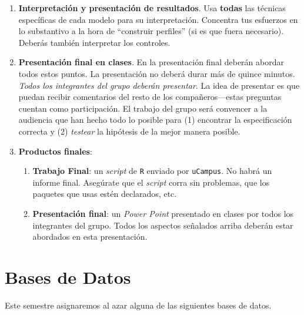 \documentclass[10pt]{article}
\begin{document}
\begin{enumerate}
  \item {\bf Interpretaci\'on y presentaci\'on de resultados}. Usa {\bf todas} las t\'ecnicas espec\'ificas de cada modelo para su interpretaci\'on. Concentra tus esfuerzos en lo substantivo a la hora de ``construir perfiles'' (si es que fuera necesario). Deber\'as tambi\'en interpretar los controles.

  \item {\bf Presentaci\'on final en clases}. En la presentaci\'on final deber\'an abordar todos estos puntos. La presentaci\'on no deber\'a durar m\'as de quince minutos. \emph{Todos los integrantes del grupo deber\'an presentar}. La idea de presentar es que puedan recibir comentarios del resto de los compa\~neros---estas preguntas cuentan como participaci\'on. El trabajo del grupo ser\'a convencer a la audiencia que han hecho todo lo posible para (1) encontrar la especificaci\'on correcta y (2) \emph{testear} la hip\'otesis de la mejor manera posible. 

  \item {\bf Productos finales}: 

    \begin{enumerate}
      \item {\bf Trabajo Final}: un \emph{script} de \texttt{R} enviado por \texttt{uCampus}. No habr\'a un informe final. Aseg\'urate que el \emph{script} corra sin problemas, que los paquetes que usas est\'en declarados, etc.
      \item {\bf Presentaci\'on final}: un \emph{Power Point} presentado en clases por todos los integrantes del grupo. Todos los aspectos se\~nalados arriba deber\'an estar abordados en esta presentaci\'on.
    \end{enumerate}

\end{enumerate}

\section*{Bases de Datos}

Este semestre asignaremos al azar alguna de las siguientes bases de datos.
\end{document}
